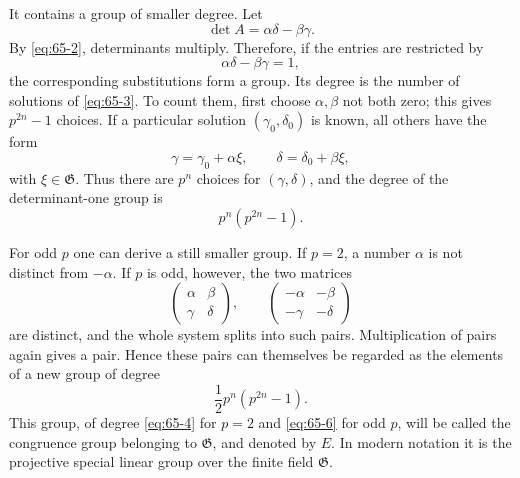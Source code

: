 \documentclass[11pt]{article}
\begin{document}
It contains a group of smaller degree.  Let
\[
 \det A=\alpha\delta-\beta\gamma.
\]
By \eqref{eq:65-2}, determinants multiply.  Therefore, if the entries are restricted by
\begin{equation}\label{eq:65-3}
 \alpha\delta-\beta\gamma=1,
\end{equation}
the corresponding substitutions form a group.  Its degree is the number of solutions of \eqref{eq:65-3}.  To count them, first choose \(\alpha,\beta\) not both zero; this gives \(p^{2n}-1\) choices.  If a particular solution \((\gamma_0,\delta_0)\) is known, all others have the form
\[
 \gamma=\gamma_0+\alpha\xi,
 \qquad
 \delta=\delta_0+\beta\xi,
\]
with \(\xi\in\mathfrak G\).  Thus there are \(p^n\) choices for \((\gamma,\delta)\), and the degree of the determinant-one group is
\begin{equation}\label{eq:65-4}
 p^n(p^{2n}-1).
\end{equation}

For odd \(p\) one can derive a still smaller group.  If \(p=2\), a number \(\alpha\) is not distinct from \(-\alpha\).  If \(p\) is odd, however, the two matrices
\begin{equation}\label{eq:65-5}
 \begin{pmatrix}\alpha&\beta\\\gamma&\delta\end{pmatrix},
 \qquad
 \begin{pmatrix}-\alpha&-\beta\\-\gamma&-\delta\end{pmatrix}
\end{equation}
are distinct, and the whole system splits into such pairs.  Multiplication of pairs again gives a pair.  Hence these pairs can themselves be regarded as the elements of a new group of degree
\begin{equation}\label{eq:65-6}
 \frac12 p^n(p^{2n}-1).
\end{equation}
This group, of degree \eqref{eq:65-4} for \(p=2\) and \eqref{eq:65-6} for odd \(p\), will be called the congruence group belonging to \(\mathfrak G\), and denoted by \(E\).  In modern notation it is the projective special linear group over the finite field \(\mathfrak G\).
\end{document}
